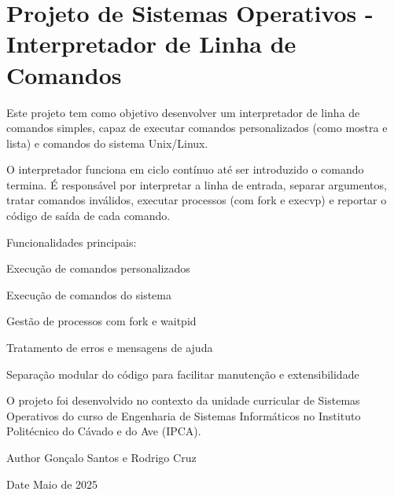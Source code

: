 \chapter{Projeto de Sistemas Operativos -\/ Interpretador de Linha de Comandos }
\hypertarget{index}{}\label{index}
Este projeto tem como objetivo desenvolver um interpretador de linha de comandos simples, capaz de executar comandos personalizados (como {\ttfamily mostra} e {\ttfamily lista}) e comandos do sistema Unix/\+Linux.

O interpretador funciona em ciclo contínuo até ser introduzido o comando {\ttfamily termina}. É responsável por interpretar a linha de entrada, separar argumentos, tratar comandos inválidos, executar processos (com fork e execvp) e reportar o código de saída de cada comando.

Funcionalidades principais\+:
\begin{DoxyItemize}
\item Execução de comandos personalizados
\item Execução de comandos do sistema
\item Gestão de processos com fork e waitpid
\item Tratamento de erros e mensagens de ajuda
\item Separação modular do código para facilitar manutenção e extensibilidade
\end{DoxyItemize}

O projeto foi desenvolvido no contexto da unidade curricular de Sistemas Operativos do curso de Engenharia de Sistemas Informáticos no Instituto Politécnico do Cávado e do Ave (IPCA).

\begin{DoxyAuthor}{Author}
Gonçalo Santos e Rodrigo Cruz
\end{DoxyAuthor}
\begin{DoxyDate}{Date}
Maio de 2025 
\end{DoxyDate}
